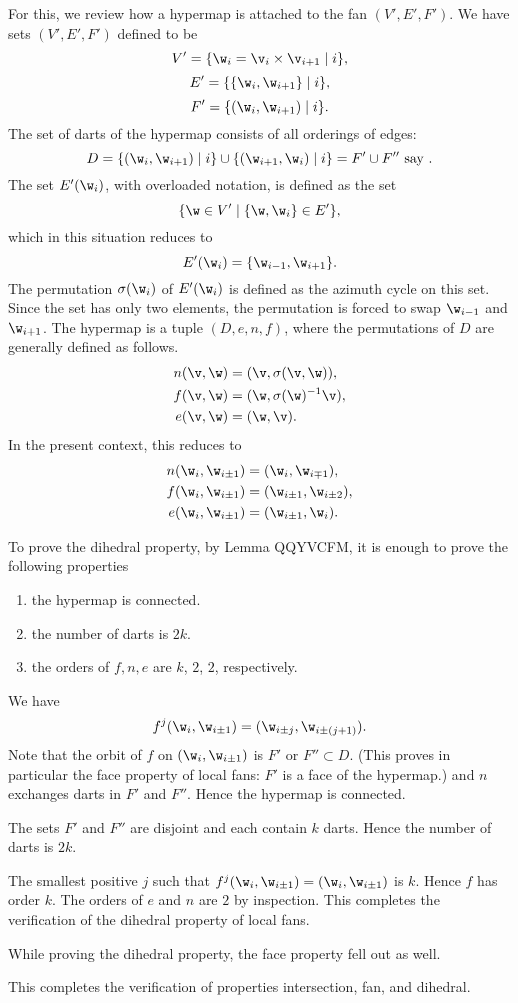 For this, we review how
a hypermap is attached to the fan $(V',E',F')$.
We have sets $(V',E',F')$ defined to be
\[
V' = \{ \w_i = \v_i \times \v_{i+1}\mid i\},
\]
\[
E' = \{\{\w_i,\w_{i+1}\}\mid i\},
\]
\[
F' = \{(\w_i,\w_{i+1})\mid i\}.
\]
The set of darts of the hypermap consists of all orderings of edges:
\[
D  =\{(\w_i,\w_{i+1}) \mid i\} \cup \{(\w_{i+1},\w_i)\mid i\} = F' \cup F'' \text{ say }.
\]
The set $E'(\w_i)$, with overloaded notation, is defined as the set
\[
\{\w\in V' \mid \{\w,\w_i\}\in E'\},
\]
which in this situation reduces to
\[
E'(\w_i) = \{\w_{i-1},\w_{i+1}\}.
\]
The permutation $\sigma(\w_i)$ of $E'(\w_i)$ is defined as the azimuth
cycle on this set.  Since the set has only two elements, the permutation is
forced to swap $\w_{i-1}$ and $\w_{i+1}$.
The hypermap is a tuple $(D,e,n,f)$, where the permutations of $D$ are
generally defined as follows.
\begin{align*}n(\v,\w) &= (\v,\sigma(\v,\w)),\\
f (\v,\w) &= (\w,\sigma(\w)^{-1} \v),\\
e (\v,\w) &= (\w,\v).
\end{align*}
In the present context, this reduces to
\begin{align*}n(\w_i,\w_{i\pm 1}) &= (\w_i,\w_{i\mp 1}),\\
f (\w_i,\w_{i\pm1}) &= (\w_{i\pm1},\w_{i\pm2}),\\
e (\w_i,\w_{i\pm 1}) &= (\w_{i\pm 1},\w_i).
\end{align*}

To prove the dihedral property, by Lemma QQYVCFM, it is enough
to prove the following properties
\begin{enumerate}
\item the hypermap is connected.
\item the number of darts is $2k$.
\item the orders of $f,n,e$ are $k$, $2$, $2$, respectively.
\end{enumerate}

We have 
\[
f^j(\w_i,\w_{i\pm1}) = (\w_{i\pm j},\w_{i\pm (j+1)}).
\]
Note that the orbit of $f$ on $(\w_i,\w_{i\pm1})$ is $F'$ or $F''\subset D$.
(This proves in particular the face property of local fans: $F'$ is a face of the
hypermap.)
and $n$ exchanges darts in $F'$ and $F''$.  Hence the hypermap is connected.

The sets $F'$ and $F''$ are disjoint and each contain $k$ darts.  Hence
the number of darts is $2k$.

The smallest positive $j$ such that $f^j(\w_i,\w_{i\pm1}) = (\w_i,\w_{i\pm1})$
is $k$.  Hence $f$ has order $k$.  The orders of $e$ and $n$ are $2$ by
inspection.  This completes the verification of the dihedral property of
local fans.

While proving the dihedral property, the face property fell out as well.

This completes the verification of properties intersection, fan, and dihedral.

